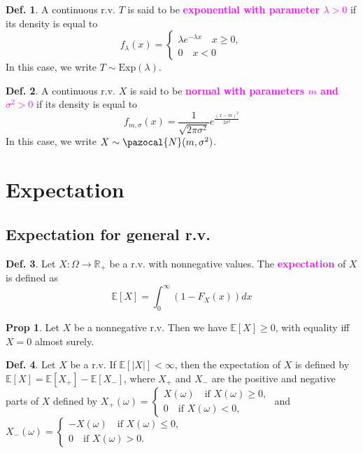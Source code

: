 \documentclass[8pt,a4paper,landscape]{article}
\theoremstyle{definition}
\newtheorem{definition}{Def.}[section]
\theoremstyle{example}
\theoremstyle{intuition}
\theoremstyle{definition}
\newtheorem{proposition}{Prop}[section]
\newcommand{\Nb}{\pazocal{N}}
\newcommand{\mydef}[1]{\textcolor{magenta}{\textbf{#1}}}
\newcommand{\expec}[1]{\mathbb{E}\left[ #1 \right]}
\begin{document}
\begin{multicols}{3}
			\begin{definition}
				A continuous r.v. $T$ is said to be \mydef{exponential with parameter $\lambda > 0$} if its density is equal to 
				$$
					f_\lambda(x) = \begin{cases}
						\lambda e^{-\lambda x} \quad x \geq 0, \\
						0 										 \quad x < 0
					\end{cases}
				$$
				In this case, we write $T \sim \text{Exp}(\lambda)$.
			\end{definition}

			\begin{definition}
				A continuous r.v. $X$ is said to be \mydef{normal with parameters $m$ and $\sigma^2 > 0$} if its density is equal to 
				$$
					f_{m,\sigma}(x) = \frac{1}{\sqrt{2 \pi \sigma^2}} e^{\frac{(x-m)^2}{2 \sigma^2}}
				$$
				In this case, we write $X \sim \Nb(m,\sigma^2)$.
			\end{definition}


	\section{Expectation}
		\subsection{Expectation for general r.v.}
			\begin{definition}
				Let $X : \Omega \to \mathbb{R}_+$ be a r.v. with nonnegative values. The \mydef{expectation} of $X$ is defined as 
				$$
					\expec{X} = \int_0^\infty (1 - F_X(x)) dx
				$$
			\end{definition}

			\begin{proposition}
				Let $X$ be a nonnegative r.v. Then we have $\expec{X} \geq 0$, with equality iff $X=0$ almost surely.
			\end{proposition}

			\begin{definition}
				Let $X$ be a r.v. If $\expec{\lvert X \lvert} < \infty$, then the expectation of $X$ is defined by $\expec{X} = \expec{X_+} - \expec{X_-}$, where $X_+$ and $X_-$ are the positive and negative parts of $X$ defined by $X_+(\omega) = \begin{cases} X(\omega) \quad \text{if } X(\omega) \geq 0, \\ 0 \quad \text{if } X(\omega) < 0,\end{cases}$ and $X_-(\omega) = \begin{cases} -X(\omega) \quad \text{if } X(\omega) \leq 0, \\ 0 \quad \text{if } X(\omega) > 0.\end{cases}$
			\end{definition}



\end{multicols}
\end{document}
